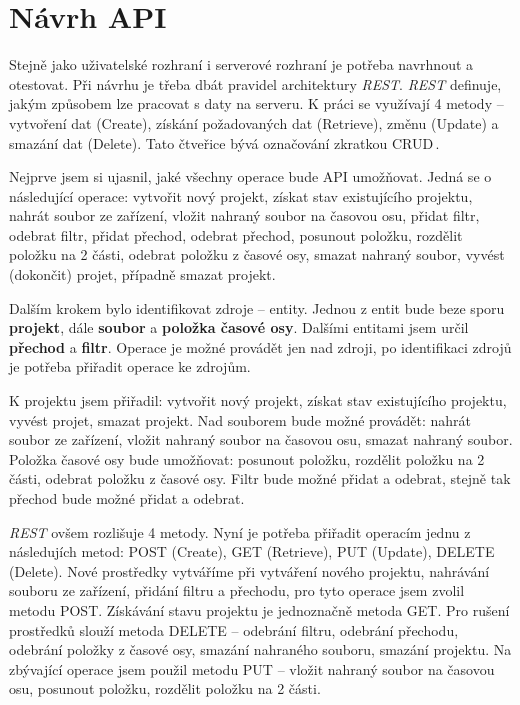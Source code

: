 \section{Návrh API}
Stejně jako uživatelské rozhraní i serverové rozhraní je potřeba navrhnout a otestovat. Při návrhu je třeba dbát pravidel architektury \textit{REST}. \textit{REST} definuje, jakým způsobem lze pracovat s daty na serveru. K práci se využívají 4 metody -- vytvoření dat (Create), získání požadovaných dat (Retrieve), změnu (Update) a smazání dat (Delete). Tato čtveřice bývá označování zkratkou CRUD\,\cite{rest}.

Nejprve jsem si ujasnil, jaké všechny operace bude API umožňovat. Jedná se o následující operace: vytvořit nový projekt, získat stav existujícího projektu, nahrát soubor ze zařízení, vložit nahraný soubor na časovou osu, přidat filtr, odebrat filtr, přidat přechod, odebrat přechod, posunout položku, rozdělit položku na 2 části, odebrat položku z časové osy, smazat nahraný soubor, vyvést (dokončit) projet, případně smazat projekt.

Dalším krokem bylo identifikovat zdroje -- entity. Jednou z entit bude beze sporu \textbf{projekt}, dále \textbf{soubor} a \textbf{položka časové osy}. Dalšími entitami jsem určil \textbf{přechod} a \textbf{filtr}. Operace je možné provádět jen nad zdroji, po identifikaci zdrojů je potřeba přiřadit operace ke zdrojům.

K projektu jsem přiřadil: vytvořit nový projekt, získat stav existujícího projektu, vyvést projet, smazat projekt. Nad souborem bude možné provádět: nahrát soubor ze zařízení, vložit nahraný soubor na časovou osu, smazat nahraný soubor. Položka časové osy bude umožňovat: posunout položku, rozdělit položku na 2 části, odebrat položku z časové osy. Filtr bude možné přidat a odebrat, stejně tak přechod bude možné přidat a odebrat.

\textit{REST} ovšem rozlišuje 4 metody. Nyní je potřeba přiřadit operacím jednu z následujích metod: POST (Create), GET (Retrieve), PUT (Update), DELETE (Delete). Nové prostředky vytváříme při vytváření nového projektu, nahrávání souboru ze zařízení, přidání filtru a přechodu, pro tyto operace jsem zvolil metodu POST. Získávání stavu projektu je jednoznačně metoda GET. Pro rušení prostředků slouží metoda DELETE -- odebrání filtru, odebrání přechodu, odebrání položky z časové osy, smazání nahraného souboru, smazání projektu. Na zbývající operace jsem použil metodu PUT -- vložit nahraný soubor na časovou osu, posunout položku, rozdělit položku na 2 části.

